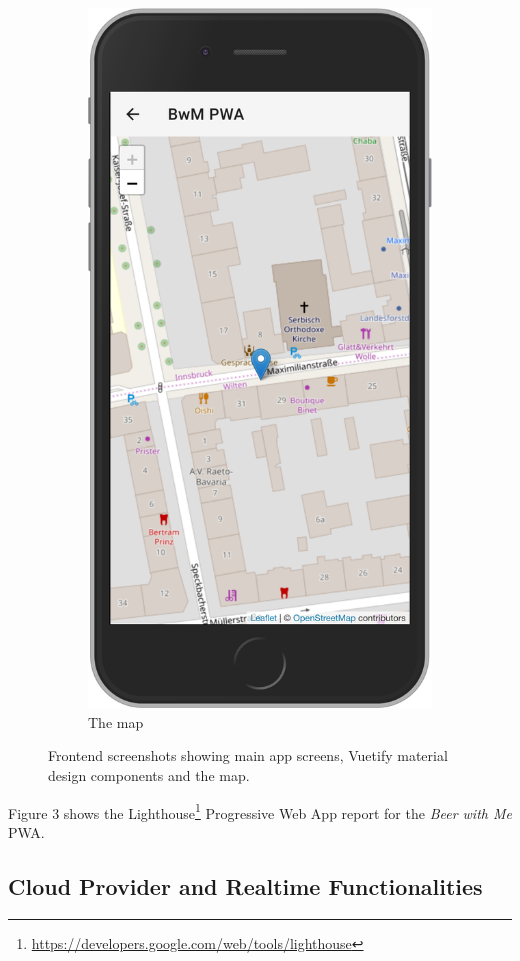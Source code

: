 \begin{figure}
\begin{subfigure}{.5\textwidth}
    \includegraphics[width=.7\linewidth]{img/screen03}
    \caption{The map}
    \label{fig:sub2}
  \end{subfigure}
  \caption{Frontend screenshots showing main app screens, Vuetify material design components and the map.}
  \label{fig:test}
\end{figure}
\pagebreak

Figure 3 shows the Lighthouse\footnote{\url{https://developers.google.com/web/tools/lighthouse}} Progressive Web App report for the \textit{Beer with Me} PWA.


\subsection{Cloud Provider and Realtime Functionalities}

